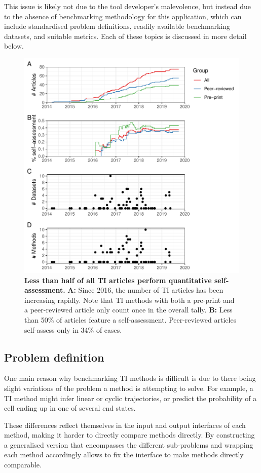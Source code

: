 This issue is likely not due to the tool developer's malevolence, but instead due to the absence of benchmarking methodology for this application, which can include standardised problem definitions, readily available benchmarking datasets, and suitable metrics.
Each of these topics is discussed in more detail below.

\begin{figure}[htb!]
	\centering
	\includegraphics[width=.75\linewidth]{fig/selfassessment/self_assessment.pdf}
	\caption{
		\textbf{Less than half of all TI articles perform quantitative self-assessment.}
		\textbf{A:} Since 2016, the number of TI articles has been increasing rapidly. Note that TI methods with both a pre-print and a peer-reviewed article only count once in the overall tally.
		\textbf{B:} Less than 50\% of articles feature a self-assessment. Peer-reviewed articles self-assess only in 34\% of cases.
	}
	\label{fig:benchmarks_over_time}
\end{figure}

\subsection{Problem definition} 
One main reason why benchmarking TI methods is difficult is due to there being slight variations of the problem a method is attempting to solve. For example, a TI method might infer linear or cyclic trajectories, or predict the probability of a cell ending up in one of several end states.

These differences reflect themselves in the input and output interfaces of each method, making it harder to directly compare methods directly. By constructing a generalised version that encompasses the different sub-problems and wrapping each method accordingly allows to fix the interface to make methods directly comparable.

